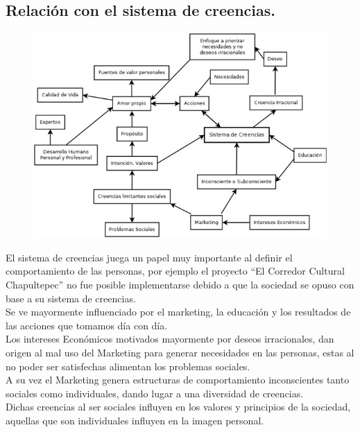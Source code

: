 \documentclass[10pt]{article}
\begin{document}
\subsection{ Relación con el sistema de creencias.}
\begin{figure}[htbp!]
	\begin{center}
		\includegraphics[scale = 1.0]{Imagen/Sistema_de_creencias.jpg}
	\end{center}
\end{figure}

El sistema de creencias juega un papel muy importante al definir el comportamiento de las personas, por ejemplo el proyecto  “El Corredor Cultural Chapultepec” no fue posible implementarse debido a que la sociedad se opuso con base a su sistema de creencias.  \\

Se ve mayormente influenciado por el marketing, la educación y los resultados de las acciones que tomamos día con día. \\

Los intereses Económicos motivados mayormente por deseos irracionales, dan origen al mal uso del Marketing para generar necesidades en las personas, estas al no poder ser satisfechas alimentan los problemas sociales. \\

A su vez el Marketing genera estructuras de comportamiento inconscientes tanto sociales como individuales, dando lugar a una diversidad de creencias.\\

Dichas creencias al ser sociales influyen en los valores y principios de la sociedad, aquellas que son individuales influyen en la imagen personal. \\
\end{document}
